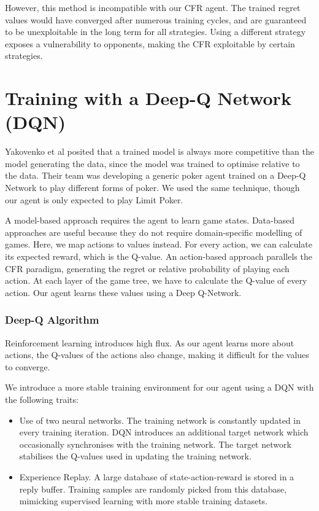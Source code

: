 \documentclass{article}
\begin{document}
However, this method is incompatible with our CFR agent. The trained regret values would have converged after numerous training cycles, and are guaranteed to be unexploitable in the long term for all strategies. Using a different strategy exposes a vulnerability to opponents, making the CFR exploitable by certain strategies.

\section{Training with a Deep-Q Network (DQN)}

Yakovenko et al posited that a trained model is always more competitive than the model generating the data, since the model was trained to optimise relative to the data. Their team was developing a generic poker agent trained on a Deep-Q Network to play different forms of poker. We used the same technique, though our agent is only expected to play Limit Poker.

A model-based approach requires the agent to learn game states. Data-based approaches are useful because they do not require domain-specific modelling of games. Here, we map actions to values instead. For every action, we can calculate its expected reward, which is the Q-value. An action-based approach parallels the CFR paradigm, generating the regret or relative probability of playing each action. At each layer of the game tree, we have to calculate the Q-value of every action. Our agent learns these values using a Deep Q-Network.

\subsubsection{Deep-Q Algorithm}
Reinforcement learning introduces high flux. As our agent learns more about actions, the Q-values of the actions also change, making it difficult for the values to converge. 

We introduce a more stable training environment for our agent using a DQN with the following traits:

\begin{itemize}
	\item Use of two neural networks. The training network is constantly updated in every training iteration. DQN introduces an additional target network which occasionally synchronises with the training network. The target network stabilises the Q-values used in updating the training network.
	\item Experience Replay. A large database of state-action-reward is stored in a reply buffer. Training samples are randomly picked from this database, mimicking supervised learning with more stable training datasets.
\end{itemize}
\end{document}
